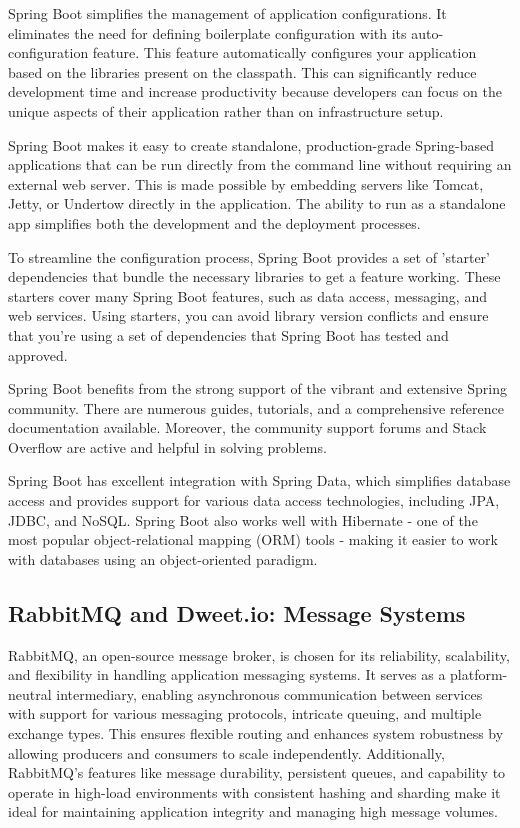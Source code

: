 Spring Boot simplifies the management of application configurations. 
It eliminates the need for defining boilerplate configuration with its auto-configuration feature.
This feature automatically configures your application based on the libraries present on the classpath. 
This can significantly reduce development time and increase productivity because developers can focus on the unique aspects of their application rather than on infrastructure setup. 

Spring Boot makes it easy to create standalone, production-grade Spring-based applications that can be run directly from the command line without requiring an external web server. 
This is made possible by embedding servers like Tomcat, Jetty, or Undertow directly in the application. 
The ability to run as a standalone app simplifies both the development and the deployment processes.

To streamline the configuration process, Spring Boot provides a set of 'starter' dependencies that bundle the necessary libraries to get a feature working. 
These starters cover many Spring Boot features, such as data access, messaging, and web services. 
Using starters, you can avoid library version conflicts and ensure that you're using a set of dependencies that Spring Boot has tested and approved.

Spring Boot benefits from the strong support of the vibrant and extensive Spring community. 
There are numerous guides, tutorials, and a comprehensive reference documentation available. 
Moreover, the community support forums and Stack Overflow are active and helpful in solving problems.

Spring Boot has excellent integration with Spring Data, which simplifies database access and provides support for various data access technologies, including JPA, JDBC, and NoSQL. 
Spring Boot also works well with Hibernate - one of the most popular object-relational mapping (ORM) tools - making it easier to work with databases using an object-oriented paradigm.

\subsection{RabbitMQ and Dweet.io: Message Systems}

RabbitMQ, an open-source message broker, is chosen for its reliability, scalability, and flexibility in handling application messaging systems.\cite{RabbitamqpSpec} It serves as a platform-neutral intermediary, enabling asynchronous communication between services with support for various messaging protocols, intricate queuing, and multiple exchange types. This ensures flexible routing and enhances system robustness by allowing producers and consumers to scale independently. Additionally, RabbitMQ's features like message durability, persistent queues, and capability to operate in high-load environments with consistent hashing and sharding make it ideal for maintaining application integrity and managing high message volumes.

